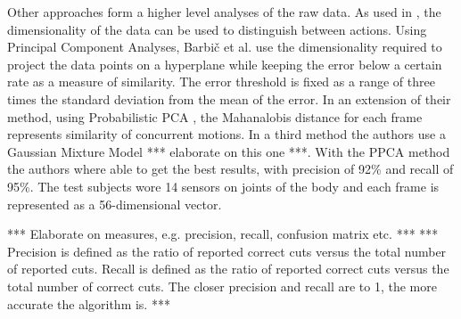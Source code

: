 Other approaches form a higher level analyses of the raw data.
As used in \cite{barbivc2004segmenting}, the dimensionality of the data can be used to distinguish between actions.
Using Principal Component Analyses, Barbi{\v{c}} et al. use the dimensionality required to project the data points on a hyperplane while keeping the error below a certain rate as a measure of similarity.
The error threshold is fixed as a range of three times the standard deviation from the mean of the error.
In an extension of their method, using Probabilistic PCA \cite{tipping1999probabilistic}, the Mahanalobis distance \cite{duda1995pattern} for each frame represents similarity of concurrent motions.
In a third method the authors use a Gaussian Mixture Model *** elaborate on this one ***.
With the PPCA method the authors where able to get the best results, with precision of 92\% and recall of 95\%.
The test subjects wore 14 sensors on joints of the body and each frame is represented as a 56-dimensional vector.


*** Elaborate on measures, e.g. precision, recall, confusion matrix etc.  ***
*** Precision is defined as the ratio of reported correct cuts versus the total number of reported cuts. Recall is defined as the ratio of reported correct cuts versus the total number of correct cuts. The closer precision and recall are to 1, the more accurate the algorithm is. ***